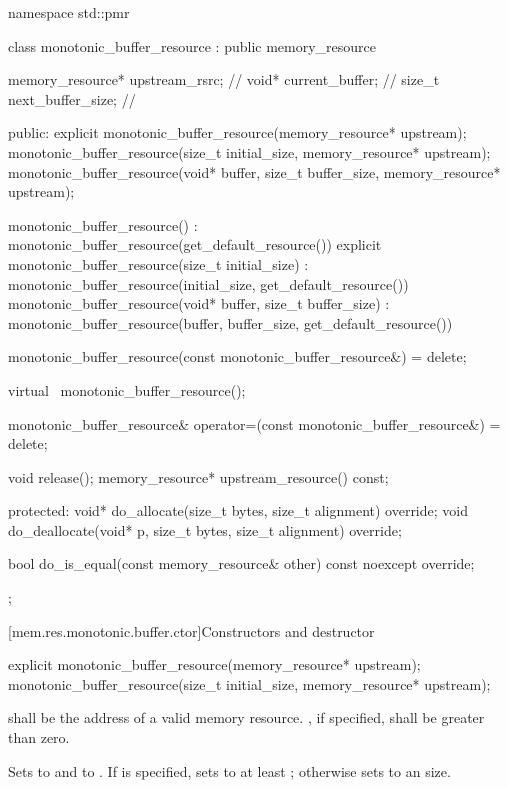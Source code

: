 %
\begin{codeblock}
namespace std::pmr {
  class monotonic_buffer_resource : public memory_resource {
    memory_resource* upstream_rsrc;     // \expos
    void* current_buffer;               // \expos
    size_t next_buffer_size;            // \expos

  public:
    explicit monotonic_buffer_resource(memory_resource* upstream);
    monotonic_buffer_resource(size_t initial_size, memory_resource* upstream);
    monotonic_buffer_resource(void* buffer, size_t buffer_size, memory_resource* upstream);

    monotonic_buffer_resource()
      : monotonic_buffer_resource(get_default_resource()) {}
    explicit monotonic_buffer_resource(size_t initial_size)
      : monotonic_buffer_resource(initial_size, get_default_resource()) {}
    monotonic_buffer_resource(void* buffer, size_t buffer_size)
      : monotonic_buffer_resource(buffer, buffer_size, get_default_resource()) {}

    monotonic_buffer_resource(const monotonic_buffer_resource&) = delete;

    virtual ~monotonic_buffer_resource();

    monotonic_buffer_resource& operator=(const monotonic_buffer_resource&) = delete;

    void release();
    memory_resource* upstream_resource() const;

  protected:
    void* do_allocate(size_t bytes, size_t alignment) override;
    void do_deallocate(void* p, size_t bytes, size_t alignment) override;

    bool do_is_equal(const memory_resource& other) const noexcept override;
  };
}
\end{codeblock}

[mem.res.monotonic.buffer.ctor]{Constructors and destructor}

%
\begin{itemdecl}
explicit monotonic_buffer_resource(memory_resource* upstream);
monotonic_buffer_resource(size_t initial_size, memory_resource* upstream);
\end{itemdecl}

\begin{itemdescr}
\pnum
\requires
{} shall be the address of a valid memory resource.
, if specified, shall be greater than zero.

\pnum
\effects
Sets  to  and
 to .
If  is specified,
sets  to at least ;
otherwise sets  to an
 size.
\end{itemdescr}

